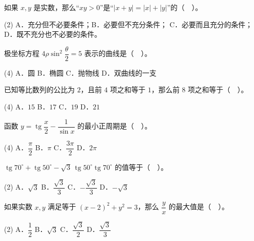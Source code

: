 \begin{question}
如果 $x,y$ 是实数，那么“$xy>0$”是“$|x+y|=|x|+|y|$”的（　）。

\begin{gkopts}(2)
\task A．充分但不必要条件；B．必要但不充分条件；
\task C．必要而且充分的条件；D．既不充分也不必要的条件。
\end{gkopts}

\end{question}
\begin{question}
极坐标方程 $4\rho\sin^2\dfrac\theta2=5$ 表示的曲线是（　）。

\begin{gkopts}(4)
\task A．圆
\task B．椭圆
\task C．抛物线
\task D．双曲线的一支
\end{gkopts}

\end{question}
\begin{question}
已知等比数列的公比为 $2$，且前 $4$ 项之和等于 $1$，那么前 $8$ 项之和等于（　）。

\begin{gkopts}(4)
\task A．$15$
\task B．$17$
\task C．$19$
\task D．$21$
\end{gkopts}

\end{question}
\begin{question}
函数 $y=\operatorname{tg}\dfrac x2-\dfrac1{\sin x}$ 的最小正周期是（　）。

\begin{gkopts}(4)
\task A．$\dfrac\pi2$
\task B．$\pi$
\task C．$\dfrac{3\pi}2$
\task D．$2\pi$
\end{gkopts}

\end{question}
\begin{question}
$\operatorname{tg}70^\circ+\operatorname{tg}50^\circ-\sqrt3\,\operatorname{tg}50^\circ\operatorname{tg}70^\circ$ 的值等于（　）。

\begin{gkopts}(2)
\task A．$\sqrt3$
\task B．$\dfrac{\sqrt3}3$
\task C．$-\dfrac{\sqrt3}3$
\task D．$-\sqrt3$
\end{gkopts}

\end{question}
\begin{question}
如果实数 $x,y$ 满足等于 $(x-2)^2+y^2=3$，那么 $\dfrac yx$ 的最大值是（　）。

\begin{gkopts}(2)
\task A．$\dfrac12$
\task B．$\sqrt3$
\task C．$\dfrac{\sqrt3}2$
\task D．$\dfrac{\sqrt3}3$
\end{gkopts}

\end{question}
